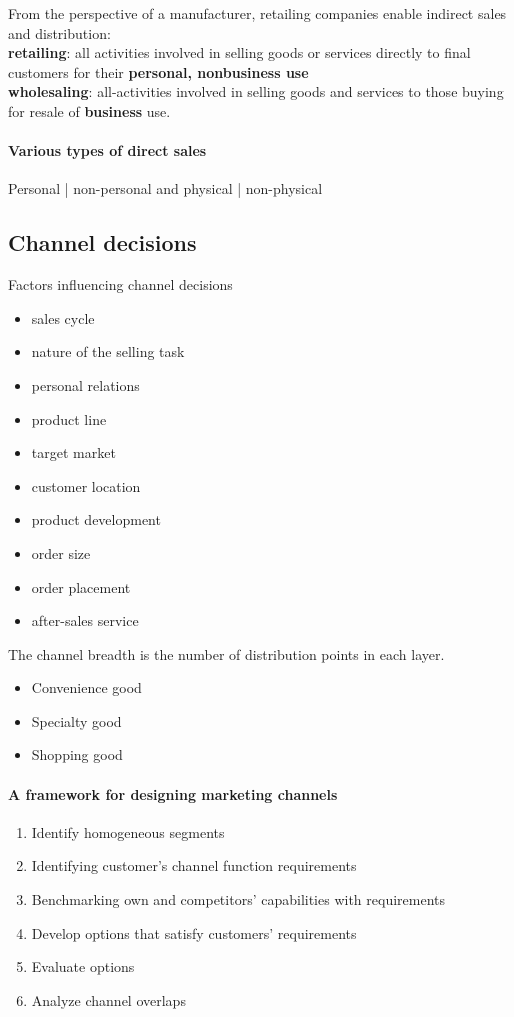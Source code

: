 \documentclass[a4paper,titlepage] {scrartcl}
\begin{document}
From the perspective of a manufacturer, retailing companies enable indirect sales and distribution:\\
\textbf{retailing}: all activities involved in selling goods or services directly to final customers for their \textbf{personal, nonbusiness use}
\\
\textbf{wholesaling}: all-activities involved in selling goods and services to those buying for resale of \textbf{business} use.


\paragraph{Various types of direct sales} %
\label{par:various_types_of_direct_sales}
Personal | non-personal and physical | non-physical

\subsection{Channel decisions} %
\label{sub:channel_decisions}
Factors influencing channel decisions
\begin{itemize}
	\item sales cycle
	\item nature of the selling task
	\item personal relations
	\item product line
	\item target market
	\item customer location
	\item product development
	\item order size
	\item order placement
	\item after-sales service
\end{itemize}


The channel breadth is the number of distribution points in each layer.
\begin{itemize}
	\item Convenience good
	\item Specialty good
	\item Shopping good
\end{itemize}


\paragraph{A framework for designing marketing channels} %
\label{par:a_framework_for_designing_marketing_channels}
\begin{enumerate}
	\item Identify homogeneous segments
	\item Identifying customer's channel function requirements
	\item Benchmarking own and competitors' capabilities with requirements
	\item Develop options that satisfy customers' requirements
	\item Evaluate options
	\item Analyze channel overlaps
\end{enumerate}
\end{document}

